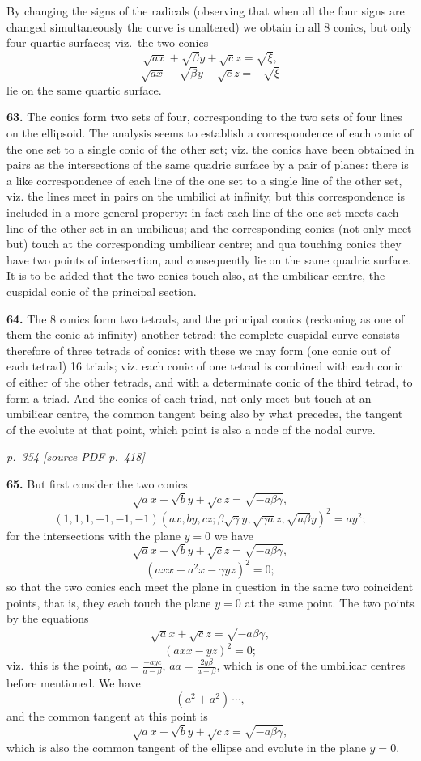 \documentclass[11pt,a4paper]{article}
\newcommand{\pagemarker}[2]{\par\bigskip\noindent\textit{p.~#1 [source PDF p.~#2]}\par\smallskip}
\begin{document}
By changing the signs of the radicals (observing that when all the four signs are changed simultaneously the curve is unaltered) we obtain in all 8 conics, but only four quartic surfaces; viz.\ the two conics
\[
\sqrt{a x} + \sqrt{\beta}y + \sqrt{c}z = \sqrt{\xi},
\]
\[
\sqrt{a x} + \sqrt{\beta}y + \sqrt{c}z = -\sqrt{\xi}
\]
lie on the same quartic surface.

\textbf{63.} The conics form two sets of four, corresponding to the two sets of four lines on the ellipsoid. The analysis seems to establish a correspondence of each conic of the one set to a single conic of the other set; viz. the conics have been obtained in pairs as the intersections of the same quadric surface by a pair of planes: there is a like correspondence of each line of the one set to a single line of the other set, viz. the lines meet in pairs on the umbilici at infinity, but this correspondence is included in a more general property: in fact each line of the one set meets each line of the other set in an umbilicus; and the corresponding conics (not only meet but) touch at the corresponding umbilicar centre; and qua touching conics they have two points of intersection, and consequently lie on the same quadric surface. It is to be added that the two conics touch also, at the umbilicar centre, the cuspidal conic of the principal section.

\textbf{64.} The 8 conics form two tetrads, and the principal conics (reckoning as one of them the conic at infinity) another tetrad: the complete cuspidal curve consists therefore of three tetrads of conics: with these we may form (one conic out of each tetrad) 16 triads; viz. each conic of one tetrad is combined with each conic of either of the other tetrads, and with a determinate conic of the third tetrad, to form a triad. And the conics of each triad, not only meet but touch at an umbilicar centre, the common tangent being also by what precedes, the tangent of the evolute at that point, which point is also a node of the nodal curve.

\clearpage

\bigskip
\pagemarker{354}{418}
\smallskip

\textbf{65.} But first consider the two conics
\[
\sqrt{a}x + \sqrt{b}y + \sqrt{c}z = \sqrt{-a\beta\gamma},
\]
\[
(1, 1, 1, -1, -1, -1)(a x, b y, c z; \beta\sqrt{\gamma}y, \sqrt{\gamma a}z, \sqrt{a\beta}y)^2 = a y^2;
\]
for the intersections with the plane $y = 0$ we have
\[
\sqrt{a}x + \sqrt{b}y + \sqrt{c}z = \sqrt{-a\beta\gamma},
\]
\[
(a x x - a^2 x - \gamma y z)^2 = 0;
\]
so that the two conics each meet the plane in question in the same two coincident points, that is, they each touch the plane $y = 0$ at the same point. The two points by the equations
\[
\sqrt{a}x + \sqrt{c}z = \sqrt{-a\beta\gamma},
\]
\[
(a x x - y z)^2 = 0;
\]
viz.\ this is the point, $a a = \tfrac{-a y c}{a - \beta}$, $a a = \tfrac{2y\beta}{a - \beta}$, which is one of the umbilicar centres before mentioned. We have
\[
(a^2 + a^2)\,\cdots,
\]
and the common tangent at this point is
\[
\sqrt{a}x + \sqrt{b}y + \sqrt{c}z = \sqrt{-a\beta\gamma},
\]
which is also the common tangent of the ellipse and evolute in the plane $y = 0$.
\end{document}
